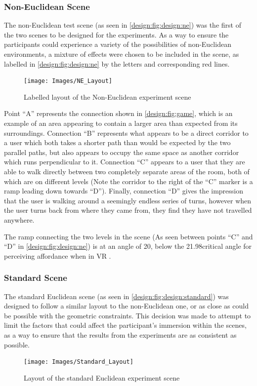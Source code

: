 		\subsubsection{Non-Euclidean Scene}

			The non-Euclidean test scene (as seen in \autoref{design:fig:design:ne}) was the first of the two scenes to be designed for the experiments.
			As a way to ensure the participants could experience a variety of the possibilities of non-Euclidean environments, a mixture of effects were chosen to be included in the scene, as labelled in \autoref{design:fig:design:ne} by the letters and corresponding red lines.

			\begin{figure}[h]
				\texttt{[image: Images/NE\_Layout]}
				\centering
				\caption{Labelled layout of the Non-Euclidean experiment scene}
				\label{design:fig:design:ne}
			\end{figure}

			Point \enquote{A} represents the connection shown in \autoref{design:fig:game}, which is an example of an area appearing to contain a larger area than expected from its surroundings.
			Connection \enquote{B} represents what appears to be a direct corridor to a user which both takes a shorter path than would be expected by the two parallel paths, but also appears to occupy the same space as another corridor which runs perpendicular to it.
			Connection \enquote{C} appears to a user that they are able to walk directly between two completely separate areas of the room, both of which are on different levels (Note the corridor to the right of the \enquote{C} marker is a ramp leading down towards \enquote{D}).
			Finally, connection \enquote{D} gives the impression that the user is walking around a seemingly endless series of turns, however when the user turns back from where they came from, they find they have not travelled anywhere.

			The ramp connecting the two levels in the scene (As seen between points \enquote{C} and \enquote{D} in \autoref{design:fig:design:ne}) is at an angle of 20\degree, below the 21.98\degree critical angle for perceiving affordance when in VR \cite{Regia-Corte2012}.

		\subsubsection{Standard Scene}
			The standard Euclidean scene (as seen in \autoref{design:fig:design:standard}) was designed to follow a similar layout to the non-Euclidean one, or as close as could be possible with the geometric constraints.
			This decision was made to attempt to limit the factors that could affect the participant's immersion within the scenes, as a way to ensure that the results from the experiments are as consistent as possible.

			\begin{figure}[H]
				\texttt{[image: Images/Standard\_Layout]}
				\centering
				\caption{Layout of the standard Euclidean experiment scene}
				\label{design:fig:design:standard}
			\end{figure}
